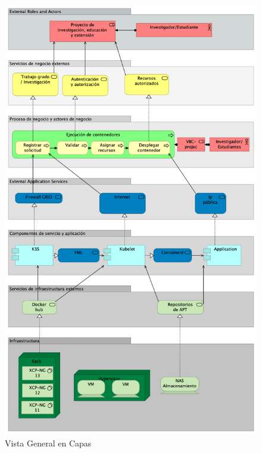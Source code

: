 \begin{figure}[H]
    \centering
    \includegraphics[scale=0.18]{tablas-images/cp6/Layered-View.png}
    \caption{Vista General en Capas}\label{fig:vista-general}
\end{figure}